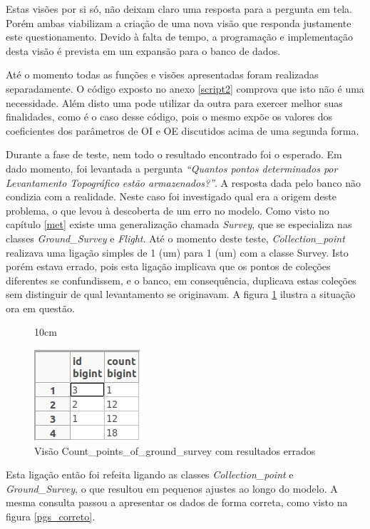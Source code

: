 Estas visões por si só, não deixam claro uma resposta para a pergunta em tela. Porém ambas viabilizam a criação de uma nova visão que responda justamente este questionamento. Devido à falta de tempo, a programação e implementação desta visão é prevista em um expansão para o banco de dados. 

Até o momento todas as funções e visões apresentadas foram realizadas separadamente. O código exposto no anexo \ref{script2} comprova que isto não é uma necessidade. Além disto uma pode utilizar da outra para exercer melhor suas finalidades, como é o caso desse código, pois o mesmo expõe os valores dos coeficientes dos parâmetros de OI e OE discutidos acima de uma segunda forma. 

Durante a fase de teste, nem todo o resultado encontrado foi o esperado. Em dado momento, foi levantada a pergunta \textit{``Quantos pontos determinados por Levantamento Topográfico estão armazenados?''}. A resposta dada pelo banco não condizia com a realidade. Neste caso foi investigado qual era a origem deste problema, o que levou à descoberta de um erro no modelo.
Como visto no capítulo \ref{met} existe uma generalização chamada \textit{Survey}, que se especializa nas classes \textit{Ground\_Survey} e \textit{Flight}. Até o momento deste teste, \textit{Collection\_point} realizava uma ligação simples de 1 (um) para 1 (um) com a classe Survey. Isto porém estava errado, pois esta ligação implicava que os pontos de coleções diferentes se confundissem, e o banco, em consequência, duplicava estas coleções sem distinguir de qual levantamento se originavam. A figura \ref{pgs_errado} ilustra a situação ora em questão.

\begin{figure}[!ht]{10cm}
  \caption{Visão Count\_points\_of\_ground\_survey com resultados errados} \label{pgs_errado}
  \centering
  \includegraphics[width=0.3\hsize]{figuras/pgs_errado.png}
\end{figure}

Esta ligação então foi refeita ligando as classes \textit{Collection\_point} e \textit{Ground\_Survey}, o que resultou em pequenos ajustes ao longo do modelo. A mesma consulta passou a apresentar os dados de forma correta, como visto na figura \ref{pgs_correto}.

